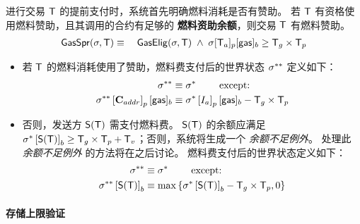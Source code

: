 进行交易 $\textsf{T}$ 的提前支付时，系统首先明确燃料消耗是否有赞助。
若 $\textsf{T}$ 有资格使用燃料赞助，且其调用的合约有足够的 \textbf{燃料资助余额}，则交易 $\textsf{T}$ 有燃料赞助。
\begin{align}
	\mathsf{GasSpr}(\mathbf{\sigma},\textsf{T}) \equiv\quad  \mathsf{GasElig}(\mathbf{\sigma},\textsf{T}) \;\wedge\; \mathbf{\sigma}[\textsf{T}_a]_p[{\sf gas}]_b\ge \textsf{T}_g\times\textsf{T}_p
\end{align}
\begin{itemize}
	\item 若 $\textsf{T}$ 的燃料消耗使用了赞助，燃料费支付后的世界状态 $\mathbf{\sigma}^{**}$ 定义如下：
	\begin{align}
		\mathbf{\sigma}^{**}  &\equiv \mathbf{\sigma}^* \qquad \mbox{  except:}\\
		\mathbf{\sigma}^{**}\left[\mathbf{C}_{addr}\right]_p[{\sf gas}]_b &\equiv \mathbf{\sigma}^*\left[I_a\right]_p[{\sf gas}]_b-\textsf{T}_g\times\textsf{T}_p
	\end{align} 
	
	\item 否则，发送方 $\mathsf{S}{\left({\textsf{T}} \right)}$ 需支付燃料费。
	$\mathsf{S}{\left({\textsf{T}} \right)}$ 的余额应满足 $\mathbf{\sigma}^{*} \left[\mathsf{S}{\left({\textsf{T}} \right)}\right]_b \ge \textsf{T}_g\times\textsf{T}_p+\textsf{T}_v$；否则，系统将生成一个 \emph{余额不足例外}。
	处理此 \emph{余额不足例外} 的方法将在之后讨论。
	燃料费支付后的世界状态定义如下：
	\begin{align}
		\mathbf{\sigma}^{**}  &\equiv \mathbf{\sigma}^* \qquad \mbox{  except:}\\
		\mathbf{\sigma}^{**} \left[\mathsf{S}{\left({\textsf{T}} \right)}\right]_b &\equiv \max{\left \{{\ensuremath{\mathbf{\sigma}}^*\left[\ensuremath{\mathsf{S}{\left({\textsf{T}} \right)}}\right]_b-\textsf{T}_g\times\textsf{T}_p,0} \right \}}
	\end{align}
\end{itemize}

\paragraph{存储上限验证}


